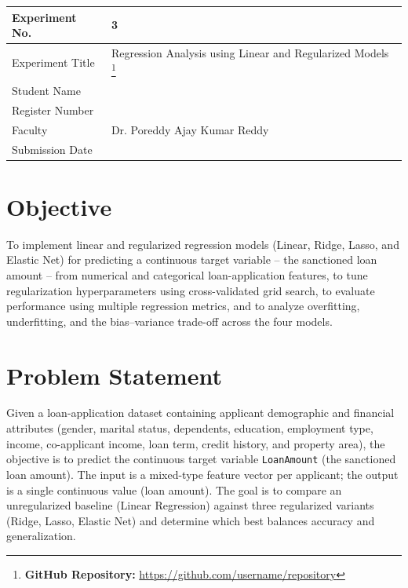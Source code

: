 \documentclass[12pt,a4paper]{article}
\begin{document}
\begin{tabular}{|p{4cm}|p{11cm}|}
\hline
Experiment No. & 3 \\ \hline
Experiment Title & Regression Analysis using Linear and Regularized Models
\footnote{\textbf{GitHub Repository: }\url{https://github.com/username/repository}}\\ \hline
Student Name & \\ \hline
Register Number & \\ \hline
Faculty & Dr. Poreddy Ajay Kumar Reddy \\ \hline
Submission Date & \\ \hline
\end{tabular}

\section{Objective}
To implement linear and regularized regression models (Linear, Ridge, Lasso, and Elastic Net)
for predicting a continuous target variable -- the sanctioned loan amount -- from numerical and
categorical loan-application features, to tune regularization hyperparameters using cross-validated
grid search, to evaluate performance using multiple regression metrics, and to analyze overfitting,
underfitting, and the bias--variance trade-off across the four models.

\section{Problem Statement}
Given a loan-application dataset containing applicant demographic and financial attributes
(gender, marital status, dependents, education, employment type, income, co-applicant income,
loan term, credit history, and property area), the objective is to predict the continuous target
variable \texttt{LoanAmount} (the sanctioned loan amount). The input is a mixed-type feature vector
per applicant; the output is a single continuous value (loan amount). The goal is to compare an
unregularized baseline (Linear Regression) against three regularized variants (Ridge, Lasso,
Elastic Net) and determine which best balances accuracy and generalization.
\end{document}

